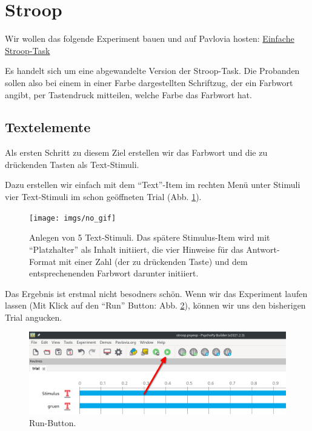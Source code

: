 \documentclass[
]{book}
\begin{document}
\hypertarget{stroop}{%
\section{Stroop}\label{stroop}}

Wir wollen das folgende Experiment bauen und auf Pavlovia hosten:
\href{https://run.pavlovia.org/M.Brede/ms_fov_stroop}{Einfache Stroop-Task}

Es handelt sich um eine abgewandelte Version der Stroop-Task. Die Probanden sollen also bei einem in einer Farbe dargestellten Schriftzug, der ein Farbwort angibt, per Tastendruck mitteilen, welche Farbe das Farbwort hat.

\hypertarget{textelemente}{%
\subsection{Textelemente}\label{textelemente}}

Als ersten Schritt zu diesem Ziel erstellen wir das Farbwort und die zu drückenden Tasten als Text-Stimuli.

Dazu erstellen wir einfach mit dem ``Text''-Item im rechten Menü unter Stimuli vier Text-Stimuli im schon geöffneten Trial (Abb. \ref{fig:Textstimuli}).



\begin{figure}

{\centering \texttt{[image: imgs/no\_gif]} 

}

\caption{Anlegen von 5 Text-Stimuli. Das spätere Stimulus-Item wird mit ``Platzhalter'' als Inhalt initiiert, die vier Hinweise für das Antwort-Format mit einer Zahl (der zu drückenden Taste) und dem entsprechenenden Farbwort darunter initiiert.}\label{fig:Textstimuli}
\end{figure}

Das Ergebnis ist erstmal nicht besodners schön. Wenn wir das Experiment laufen lassen (Mit Klick auf den ``Run'' Button: Abb. \ref{fig:Run}), können wir uns den bisherigen Trial angucken.



\begin{figure}

{\centering \includegraphics[width=.8\textwidth]{imgs/Run} 

}

\caption{Run-Button.}\label{fig:Run}
\end{figure}
\end{document}
